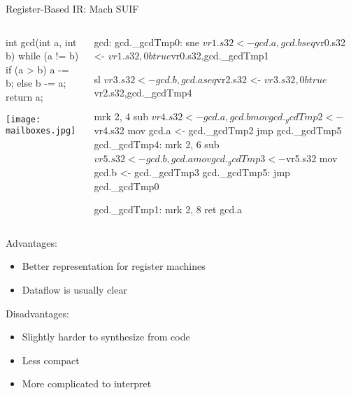 \documentclass{plt}
\begin{document}
\begin{frame}[fragile]{Register-Based IR: Mach SUIF}


  \begin{columns}
    \begin{column}{0.35\textwidth}
\begin{java}
int gcd(int a, int b) {
  while (a != b) {
    if (a > b)
      a -= b;
    else
      b -= a;
  }
  return a;
}
\end{java}

\vspace{2pc}

\texttt{[image: mailboxes.jpg]}
    \end{column}
    \begin{column}{0.65\textwidth}
\fontsize{8}{8}\selectfont
\begin{semiverbatim}
gcd:
gcd._gcdTmp0:
  sne   $vr1.s32 <- gcd.a,gcd.b
  seq   $vr0.s32 <- $vr1.s32,0
  btrue $vr0.s32,gcd._gcdTmp1  

  sl    $vr3.s32 <- gcd.b,gcd.a
  seq   $vr2.s32 <- $vr3.s32,0
  btrue $vr2.s32,gcd._gcdTmp4  

  mrk   2, 4   
  sub   $vr4.s32 <- gcd.a,gcd.b
  mov   gcd._gcdTmp2 <- $vr4.s32
  mov   gcd.a <- gcd._gcdTmp2  
  jmp   gcd._gcdTmp5
gcd._gcdTmp4:
  mrk   2, 6
  sub   $vr5.s32 <- gcd.b,gcd.a
  mov   gcd._gcdTmp3 <- $vr5.s32
  mov   gcd.b <- gcd._gcdTmp3  
gcd._gcdTmp5:
  jmp   gcd._gcdTmp0

gcd._gcdTmp1:
  mrk   2, 8
  ret   gcd.a  
\end{semiverbatim}
    \end{column}
  \end{columns}
\end{frame}

\begin{frame}


Advantages:

\begin{itemize}
\item Better representation for register machines

\item Dataflow is usually clear
\end{itemize}

Disadvantages:

\begin{itemize}
\item Slightly harder to synthesize from code

\item Less compact

\item More complicated to interpret
\end{itemize}

\end{frame}
\end{document}
